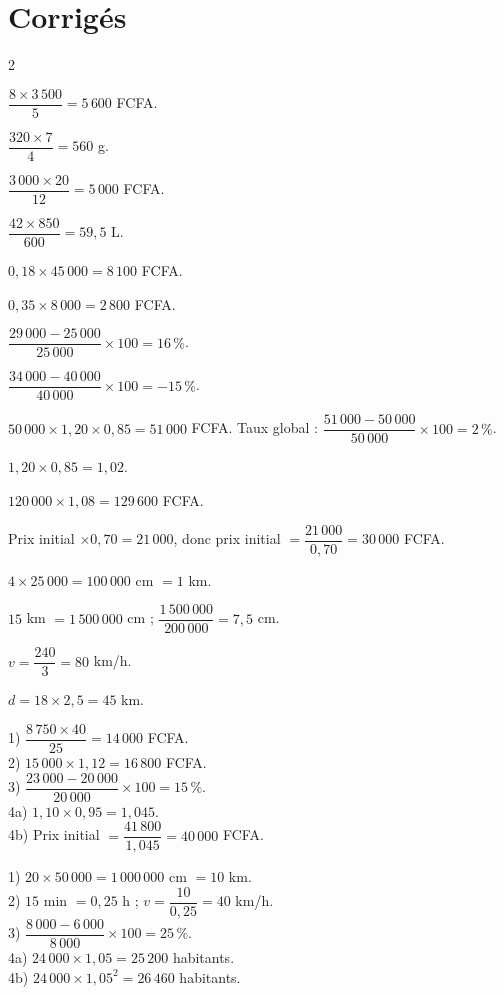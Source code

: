 \section{Corrigés}
\begin{multicols}{2}

$\dfrac{8\times3\,500}5=5\,600$ FCFA.

$\dfrac{320\times7}4=560$ g.

$\dfrac{3\,000\times20}{12}=5\,000$ FCFA.

$\dfrac{42\times850}{600}=59{,}5$ L.

$0{,}18\times45\,000=8\,100$ FCFA.

$0{,}35\times8\,000=2\,800$ FCFA.

$\dfrac{29\,000-25\,000}{25\,000}\times100=16\,\%$.

$\dfrac{34\,000-40\,000}{40\,000}\times100=-15\,\%$.

$50\,000\times1{,}20\times0{,}85=51\,000$ FCFA. Taux global :
$\dfrac{51\,000-50\,000}{50\,000}\times100=2\,\%$.

$1{,}20\times0{,}85=1{,}02$.

$120\,000\times1{,}08=129\,600$ FCFA.

Prix initial $\times0{,}70=21\,000$, donc prix initial $=\dfrac{21\,000}{0{,}70}=30\,000$
FCFA.

$4\times25\,000=100\,000$ cm $=1$ km.

$15$ km $=1\,500\,000$ cm ; $\dfrac{1\,500\,000}{200\,000}=7{,}5$ cm.

$v=\dfrac{240}3=80$ km/h.

$d=18\times2{,}5=45$ km.

1) $\dfrac{8\,750\times40}{25}=14\,000$ FCFA.\\
2) $15\,000\times1{,}12=16\,800$ FCFA.\\
3) $\dfrac{23\,000-20\,000}{20\,000}\times100=15\,\%$.\\
4a) $1{,}10\times0{,}95=1{,}045$.\\
4b) Prix initial $=\dfrac{41\,800}{1{,}045}=40\,000$ FCFA.

1) $20\times50\,000=1\,000\,000$ cm $=10$ km.\\
2) $15$ min $=0{,}25$ h ; $v=\dfrac{10}{0{,}25}=40$ km/h.\\
3) $\dfrac{8\,000-6\,000}{8\,000}\times100=25\,\%$.\\
4a) $24\,000\times1{,}05=25\,200$ habitants.\\
4b) $24\,000\times1{,}05^{2}=26\,460$ habitants.


\end{multicols}
